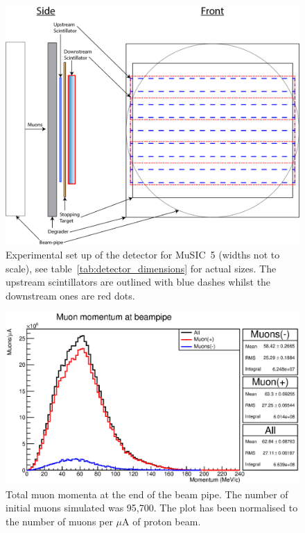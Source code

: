 \begin{figure}[htbp]
    \centering
        \includegraphics[scale=0.5]{images/momentum_spectrum/Detector_setup_music5.png}
    \caption{Experimental set up of the detector for MuSIC~5 (widths not to scale), see table~\ref{tab:detector_dimensions} for actual sizes. The upstream scintillators are outlined with blue dashes whilst the downstream ones are red dots.}
    \label{fig:m5_setup}
\end{figure}  

\begin{figure}[hptb]
  \centering
    \includegraphics[width=.9\textwidth]{images/momentum_spectrum/muon_momentum_at_beam_pipe_exit.eps}
  \caption{Total muon momenta at the end of the beam pipe. The number of initial muons simulated was 95,700. The plot has been normalised to the number of muons per \(\mu\)A of proton beam.}
  \label{fig:images_momentum_spectrum_muon_momentum_at_beam_pipe_exit}
\end{figure}

